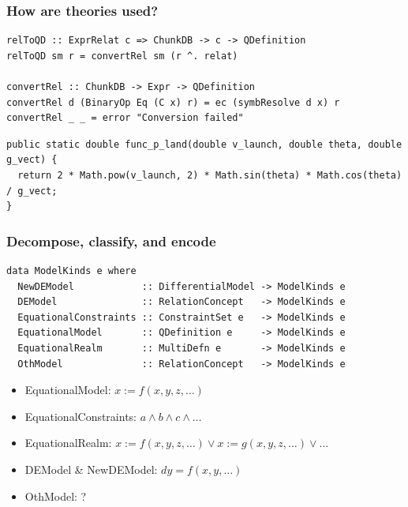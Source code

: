 \documentclass[xcolor={dvipsnames}]{beamer}
\begin{document}
\begin{frame}[fragile]
  \frametitle{How are theories used?}

\begin{verbatim}
relToQD :: ExprRelat c => ChunkDB -> c -> QDefinition
relToQD sm r = convertRel sm (r ^. relat)

convertRel :: ChunkDB -> Expr -> QDefinition
convertRel d (BinaryOp Eq (C x) r) = ec (symbResolve d x) r
convertRel _ _ = error "Conversion failed"
\end{verbatim}

\vspace{2em}

\begin{verbatim}
public static double func_p_land(double v_launch, double theta, double g_vect) {
  return 2 * Math.pow(v_launch, 2) * Math.sin(theta) * Math.cos(theta) / g_vect;
}
\end{verbatim}

\end{frame}

\begin{frame}[fragile]
  \frametitle{Decompose, classify, and encode}

\begin{verbatim}
data ModelKinds e where
  NewDEModel            :: DifferentialModel -> ModelKinds e
  DEModel               :: RelationConcept   -> ModelKinds e
  EquationalConstraints :: ConstraintSet e   -> ModelKinds e
  EquationalModel       :: QDefinition e     -> ModelKinds e
  EquationalRealm       :: MultiDefn e       -> ModelKinds e
  OthModel              :: RelationConcept   -> ModelKinds e
\end{verbatim}

  \vspace{0.2cm}

  \begin{itemize}
    \item EquationalModel: \(x := f(x,y,z,\ldots{})\)
    \item EquationalConstraints: \(a \land b \land c \land \ldots{}\)
    \item EquationalRealm: \(x := f(x,y,z,\ldots{}) \lor x := g(x,y,z,\ldots{}) \lor \ldots{}\)
    \item DEModel \& NewDEModel: \(dy = f(x, y, \ldots{})\)
    \item OthModel: ?
  \end{itemize}
\end{frame}
\end{document}
